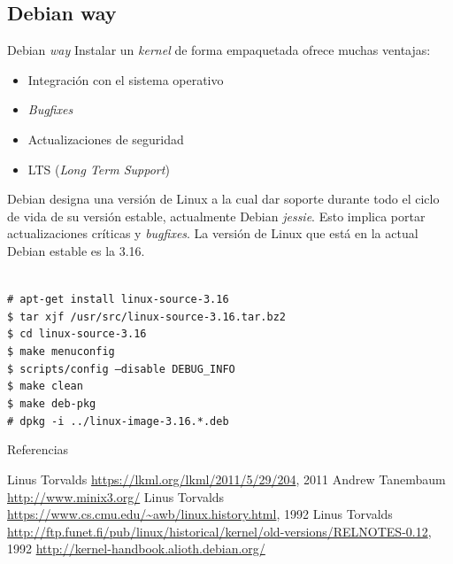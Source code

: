 \subsection{Debian way}
\begin{frame}{Debian \textit{way}}
Instalar un \textit{kernel} de forma empaquetada ofrece muchas ventajas:
\begin{itemize}
\item Integración con el sistema operativo
\item \textit{Bugfixes}
\item Actualizaciones de \alert{seguridad}
\item LTS (\textit{Long Term Support})
\end{itemize}

\vfill Debian designa una versión de Linux a la cual dar soporte durante
todo el ciclo de vida de su versión estable, actualmente Debian
\textit{jessie}. Esto implica portar actualizaciones críticas y
\textit{bugfixes}. La versión de Linux que está en la actual Debian estable
es la 3.16.

{ \tiny
  \begin{block}{}
    \texttt{\\
\# apt-get install linux-source-3.16 \\
\$ tar xjf /usr/src/linux-source-3.16.tar.bz2 \\
\$ cd linux-source-3.16 \\
\$ make menuconfig \\
\$ scripts/config --disable DEBUG\_INFO \\
\$ make clean \\
\$ make deb-pkg \\
\# dpkg -i ../linux-image-3.16.*.deb
}
\end{block} }

\end{frame}

\begin{frame}{Referencias}
  \begin{thebibliography}{Foo Bar Baz, 1968}\footnotesize
   Linus Torvalds 
    \newblock \url{https://lkml.org/lkml/2011/5/29/204}, 2011
   Andrew Tanembaum  \newblock
    \url{http://www.minix3.org/}
   Linus Torvalds  \newblock
    \url{https://www.cs.cmu.edu/~awb/linux.history.html}, 1992
   Linus Torvalds  \newblock
    \url{http://ftp.funet.fi/pub/linux/historical/kernel/old-versions/RELNOTES-0.12}, 1992
   
    \newblock \url{http://kernel-handbook.alioth.debian.org/}
  \end{thebibliography}
\end{frame}

